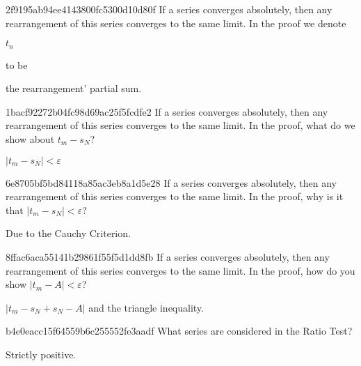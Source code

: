 \begin{note}{2f9195ab94ee4143800fc5300d10d80f}
    If a series converges absolutely, then any rearrangement of this series converges to the same limit.
    In the proof we denote \begin{icloze}{2}\({ t_n }\)\end{icloze} to be \begin{icloze}{1}the rearrangement' partial sum.\end{icloze}
\end{note}

\begin{note}{1bacf92272b04fc98d69ac25f5fcdfe2}
    If a series converges absolutely, then any rearrangement of this series converges to the same limit.
    In the proof, what do we show about \({ t_m - s_N }\)?

    \begin{cloze}{1}
        \({ \left\lvert t_m - s_N \right\rvert < \varepsilon }\)
    \end{cloze}
\end{note}

\begin{note}{6e8705bf5bd84118a85ac3eb8a1d5e28}
    If a series converges absolutely, then any rearrangement of this series converges to the same limit.
    In the proof, why is it that \({ \left\lvert t_m - s_N \right\rvert < \varepsilon }\)?

    \begin{cloze}{1}
        Due to the Cauchy Criterion.
    \end{cloze}
\end{note}

\begin{note}{8ffac6aca55141b29861f55f5d1dd8fb}
    If a series converges absolutely, then any rearrangement of this series converges to the same limit.
    In the proof, how do you show \({ \left\lvert t_m - A \right\rvert < \varepsilon }\)?

    \begin{cloze}{1}
        \({ \left\lvert t_m - s_N + s_N - A \right\rvert }\) and the triangle inequality.
    \end{cloze}
\end{note}

\begin{note}{b4e0eacc15f64559b6c255552fe3aadf}
    What series are considered in the Ratio Test?

    \begin{cloze}{1}
        Strictly positive.
    \end{cloze}
\end{note}

